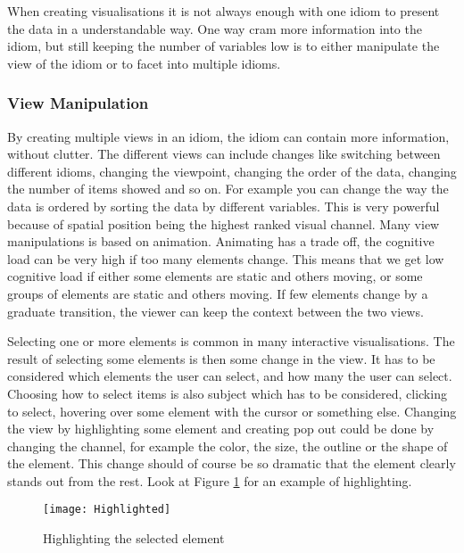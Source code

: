 \documentclass[Report.tex]{subfiles}
\begin{document}
When creating visualisations it is not always enough with one idiom to present the data in a understandable way. One way cram more information into the idiom, but still keeping the number of variables low is to either manipulate the view of the idiom or to facet into multiple idioms. 
\subsubsection{View Manipulation}
By creating multiple views in an idiom, the idiom can contain more information, without clutter. The different views can include changes like switching between different idioms, changing the viewpoint, changing the order of the data, changing the number of items showed and so on. For example you can change the way the data is ordered by sorting the data by different variables. This is very powerful because of spatial position being the highest ranked visual channel. Many view manipulations is based on animation. Animating has a trade off, the cognitive load can be very high if too many elements change. This means that we get low cognitive load if either some elements are static and others moving, or some groups of elements are static and others moving. If few elements change by a graduate transition, the viewer can keep the context between the two views. \cite[Chapter 11]{Tamara}

Selecting one or more elements is common in many interactive visualisations. The result of selecting some elements is then some change in the view. It has to be considered which elements the user can select, and how many the user can select. Choosing how to select items is also subject which has to be considered, clicking to select, hovering over some element with the cursor or something else. 
Changing the view by highlighting some element and creating pop out could be done by changing the channel, for example the color, the size, the outline or the shape of the element. This change should of course be so dramatic that the element clearly stands out from the rest. Look at Figure \ref{fig:highlighted} for an example of highlighting. \cite[Chapter 11]{Tamara}
\begin{figure}
\center
\texttt{[image: Highlighted]}
\caption{Highlighting the selected element}
\label{fig:highlighted}
\end{figure}
\end{document}
